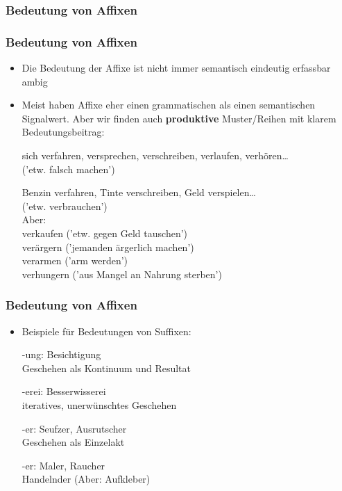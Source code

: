 \subsubsection{Bedeutung von Affixen}

\begin{frame}
\frametitle{Bedeutung von Affixen}

\begin{itemize}
	\item Die Bedeutung der Affixe ist nicht immer semantisch eindeutig erfassbar \ras ambig
	\item Meist haben Affixe eher einen grammatischen als einen semantischen Signalwert. Aber wir finden auch \textbf{produktive} Muster/Reihen mit klarem Bedeutungsbeitrag:
	
	\ea sich verfahren, versprechen, verschreiben, verlaufen, verhören…\\
	\ras('etw. falsch machen')
	\z
	
	\ea Benzin verfahren, Tinte verschreiben, Geld verspielen\dots \\
\ras ('etw. verbrauchen')\\
Aber:\\
verkaufen ('etw. gegen Geld tauschen')\\
verärgern ('jemanden ärgerlich machen')\\
verarmen ('arm werden')\\
verhungern ('aus Mangel an Nahrung sterben')
	\z

\end{itemize}


\end{frame}




\begin{frame}
\frametitle{Bedeutung von Affixen}

\begin{itemize}
	\item Beispiele für Bedeutungen von Suffixen:

\vspace{1em}

	\ea -ung: Besichtigung\\
	\ras Geschehen als Kontinuum und Resultat
	\z
	
	\ea -erei: Besserwisserei\\
\ras iteratives, unerwünschtes Geschehen
	\z

	\ea -er: Seufzer, Ausrutscher\\
\ras Geschehen als Einzelakt
	\z

	\ea -er: Maler, Raucher\\ 
	\ras Handelnder (Aber: Aufkleber)
	\z

\end{itemize}


\end{frame}



